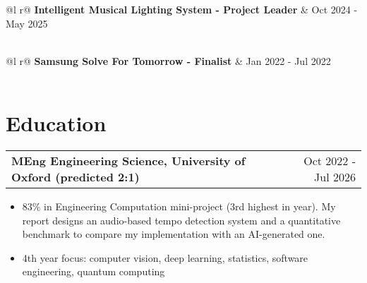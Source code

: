 \documentclass[a4paper,10pt]{article}
\makeatletter
\newenvironment{joblong}[2]
    {
    \begin{tabularx}{\linewidth}{@{}l X r@{}}
    \textbf{#1} & \hfill &  #2 \\[2pt]
    \end{tabularx}
    \begin{minipage}[t]{\linewidth}
    \begin{itemize}[nosep,after=\strut, leftmargin=1em, itemsep=1pt,label=--]
    }
    {
    \end{itemize}
    \end{minipage}    
    }
\makeatother
\begin{document}
\vspace{1pt}

\begin{tabularx}{\linewidth}{ @{}l r@{} }
\textbf{Intelligent Musical Lighting System - Project Leader} & \hfill Oct 2024 - May 2025 \\[2pt]
  \\
\end{tabularx}

\vspace{1pt}

\begin{tabularx}{\linewidth}{ @{}l r@{} }
\textbf{Samsung Solve For Tomorrow - Finalist} & \hfill Jan 2022 - Jul 2022 \\[2pt]
  \\
\end{tabularx}

\vspace{12pt}

\section{Education}

\begin{joblong}{MEng Engineering Science, University of Oxford (predicted 2:1)}{Oct 2022 - Jul 2026}
\item 83\% in Engineering Computation mini-project (3rd highest in year). My report designs an audio-based tempo detection system and a quantitative benchmark to compare my implementation with an AI-generated one.
\item 4th year focus: computer vision, deep learning, statistics, software engineering, quantum computing
\end{joblong}
\end{document}
